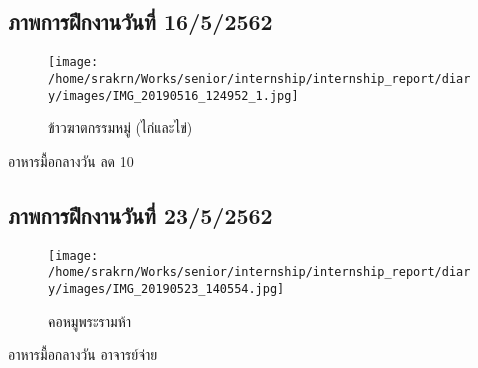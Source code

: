 
\subsection*{ภาพการฝึกงานวันที่ 16/5/2562}
\begin{figure}[h]
    \centering
    \texttt{[image: /home/srakrn/Works/senior/internship/internship\_report/diary/images/IMG\_20190516\_124952\_1.jpg]}
    \caption{ข้าวฆาตกรรมหมู่ (ไก่และไข่)}
\end{figure}

อาหารมื้อกลางวัน ลด 10%

\subsection*{ภาพการฝึกงานวันที่ 23/5/2562}
\begin{figure}[h]
    \centering
    \texttt{[image: /home/srakrn/Works/senior/internship/internship\_report/diary/images/IMG\_20190523\_140554.jpg]}
    \caption{คอหมูพระรามห้า}
\end{figure}

อาหารมื้อกลางวัน อาจารย์จ่าย
